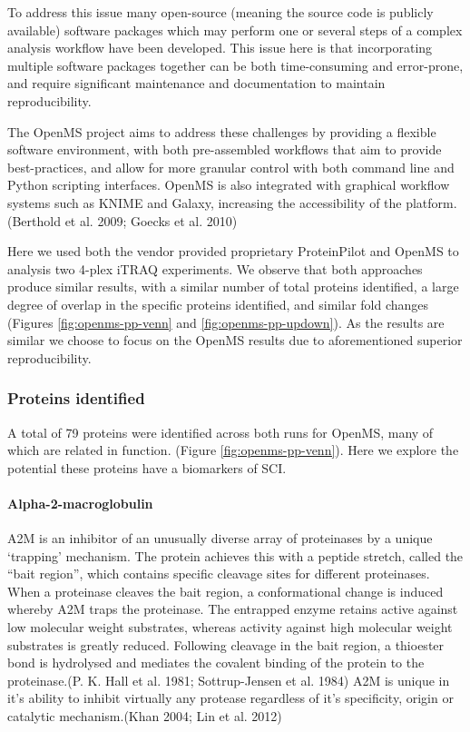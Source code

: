 \documentclass[9pt,lineno]{elife}
\begin{document}
To address this issue many open-source (meaning the source code is publicly available) software packages which may perform one or several steps of a complex analysis workflow have been developed.
This issue here is that incorporating multiple software packages together can be both time-consuming and error-prone, and require significant maintenance and documentation to maintain reproducibility.

The OpenMS project aims to address these challenges by providing a flexible software environment, with both pre-assembled workflows that aim to provide best-practices, and allow for more granular control with both command line and Python scripting interfaces.
OpenMS is also integrated with graphical workflow systems such as KNIME and Galaxy, increasing the accessibility of the platform.(Berthold et al. 2009; Goecks et al. 2010)

Here we used both the vendor provided proprietary ProteinPilot and OpenMS to analysis two 4-plex iTRAQ experiments.
We observe that both approaches produce similar results, with a similar number of total proteins identified, a large degree of overlap in the specific proteins identified, and similar fold changes (Figures \ref{fig:openms-pp-venn} and \ref{fig:openms-pp-updown}).
As the results are similar we choose to focus on the OpenMS results due to aforementioned superior reproducibility.

\hypertarget{proteins-identified}{%
\subsubsection{Proteins identified}\label{proteins-identified}}

A total of 79 proteins were identified across both runs for OpenMS, many of which are related in function. (Figure \ref{fig:openms-pp-venn}).
Here we explore the potential these proteins have a biomarkers of SCI.

\hypertarget{alpha-2-macroglobulin}{%
\paragraph{Alpha-2-macroglobulin}\label{alpha-2-macroglobulin}}

A2M is an inhibitor of an unusually diverse array of proteinases by a unique `trapping' mechanism.
The protein achieves this with a peptide stretch, called the ``bait region'', which contains specific cleavage sites for different proteinases.
When a proteinase cleaves the bait region, a conformational change is induced whereby A2M traps the proteinase.
The entrapped enzyme retains active against low molecular weight substrates, whereas activity against high molecular weight substrates is greatly reduced.
Following cleavage in the bait region, a thioester bond is hydrolysed and mediates the covalent binding of the protein to the proteinase.(P. K. Hall et al. 1981; Sottrup-Jensen et al. 1984)
A2M is unique in it's ability to inhibit virtually any protease regardless of it's specificity, origin or catalytic mechanism.(Khan 2004; Lin et al. 2012)
\end{document}
